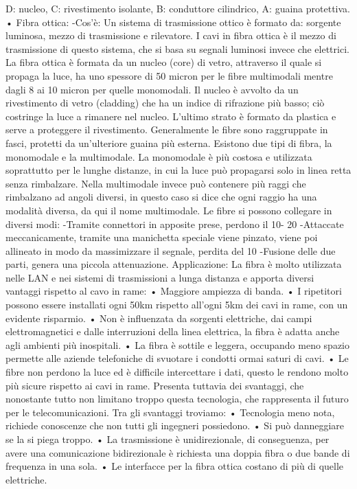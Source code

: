 D: nucleo, C: rivestimento isolante, B: conduttore cilindrico, A: guaina protettiva.
•	Fibra ottica:
-Cos’è: Un sistema di trasmissione ottico è formato da: sorgente luminosa, mezzo di trasmissione e rilevatore. I cavi in fibra ottica è il mezzo di trasmissione di questo sistema, che si basa su segnali luminosi invece che elettrici.
La fibra ottica è formata da un nucleo (core) di vetro, attraverso il quale si propaga la luce, ha uno spessore di 50 micron per le fibre multimodali mentre dagli 8 ai 10 micron per quelle monomodali.
Il nucleo è avvolto da un rivestimento di vetro (cladding) che ha un indice di rifrazione più basso; ciò costringe la luce a rimanere nel nucleo. L’ultimo strato è formato da plastica e serve a proteggere il rivestimento. Generalmente le fibre sono raggruppate in fasci, protetti da un’ulteriore guaina più esterna.  
Esistono due tipi di fibra, la monomodale e la multimodale. La monomodale è più costosa e utilizzata soprattutto per le lunghe distanze, in cui la luce può propagarsi solo in linea retta senza rimbalzare.
Nella multimodale invece può contenere più raggi che rimbalzano ad angoli diversi, in questo caso si dice che ogni raggio ha una modalità diversa, da qui il nome multimodale.
Le fibre si possono collegare in diversi modi: -Tramite connettori in apposite prese, perdono il 10-   20%
-Attaccate meccanicamente, tramite una manichetta speciale viene pinzato, viene poi allineato in modo da massimizzare il segnale, perdita del 10%
-Fusione delle due parti, genera una piccola attenuazione.
Applicazione: La fibra è molto utilizzata nelle LAN e nei sistemi di trasmissioni a lunga distanza e apporta diversi vantaggi rispetto al cavo in rame:
•	Maggiore ampiezza di banda.
•	I ripetitori possono essere installati ogni 50km rispetto all’ogni 5km dei cavi in rame, con un evidente risparmio.
•	Non è influenzata da sorgenti elettriche, dai campi elettromagnetici e dalle interruzioni della linea elettrica, la fibra è adatta anche agli ambienti più inospitali.
•	La fibra è sottile e leggera, occupando meno spazio permette alle aziende telefoniche di svuotare i condotti ormai saturi di cavi.
•	Le fibre non perdono la luce ed è difficile intercettare i dati, questo le rendono molto più sicure rispetto ai cavi in rame.
Presenta tuttavia dei svantaggi, che nonostante tutto non limitano troppo questa tecnologia, che rappresenta il futuro per le telecomunicazioni. Tra gli svantaggi troviamo:
•	Tecnologia meno nota, richiede conoscenze che non tutti gli ingegneri possiedono.
•	Si può danneggiare se la si piega troppo.
•	La trasmissione è unidirezionale, di conseguenza, per avere una comunicazione bidirezionale è richiesta una doppia fibra o due bande di frequenza in una sola.
•	Le interfacce per la fibra ottica costano di più di quelle elettriche.


